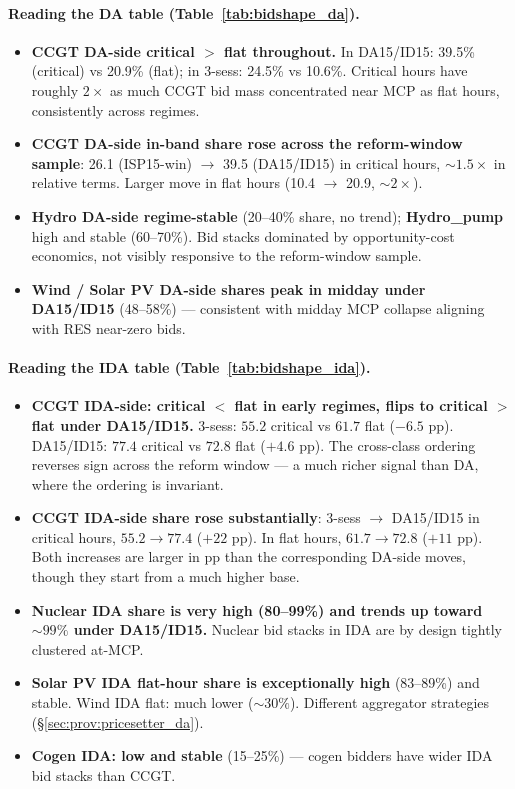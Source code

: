 \documentclass[11pt,a4paper]{article}
\begin{document}
\paragraph{Reading the DA table (Table~\ref{tab:bidshape_da}).}
\begin{itemize}
\item \textbf{CCGT DA-side critical $>$ flat throughout.} In DA15/ID15: 39.5\% (critical) vs 20.9\% (flat); in 3-sess: 24.5\% vs 10.6\%. Critical hours have roughly $2\times$ as much CCGT bid mass concentrated near MCP as flat hours, consistently across regimes.
\item \textbf{CCGT DA-side in-band share rose across the reform-window sample}: 26.1 (ISP15-win) $\to$ 39.5 (DA15/ID15) in critical hours, $\sim 1.5\times$ in relative terms. Larger move in flat hours (10.4 $\to$ 20.9, $\sim 2\times$).
\item \textbf{Hydro DA-side regime-stable} (20--40\% share, no trend); \textbf{Hydro\_pump} high and stable (60--70\%). Bid stacks dominated by opportunity-cost economics, not visibly responsive to the reform-window sample.
\item \textbf{Wind / Solar PV DA-side shares peak in midday under DA15/ID15} (48--58\%) --- consistent with midday MCP collapse aligning with RES near-zero bids.
\end{itemize}

\paragraph{Reading the IDA table (Table~\ref{tab:bidshape_ida}).}
\begin{itemize}
\item \textbf{CCGT IDA-side: critical $<$ flat in early regimes, flips to critical $>$ flat under DA15/ID15.} 3-sess: $55.2$ critical vs $61.7$ flat ($-6.5$ pp). DA15/ID15: $77.4$ critical vs $72.8$ flat ($+4.6$ pp). The cross-class ordering reverses sign across the reform window --- a much richer signal than DA, where the ordering is invariant.
\item \textbf{CCGT IDA-side share rose substantially}: 3-sess $\to$ DA15/ID15 in critical hours, $55.2 \to 77.4$ ($+22$ pp). In flat hours, $61.7 \to 72.8$ ($+11$ pp). Both increases are larger in pp than the corresponding DA-side moves, though they start from a much higher base.
\item \textbf{Nuclear IDA share is very high (80--99\%) and trends up toward $\sim 99\%$ under DA15/ID15.} Nuclear bid stacks in IDA are by design tightly clustered at-MCP.
\item \textbf{Solar PV IDA flat-hour share is exceptionally high} (83--89\%) and stable. Wind IDA flat: much lower ($\sim 30\%$). Different aggregator strategies (\S\ref{sec:prov:pricesetter_da}).
\item \textbf{Cogen IDA: low and stable} (15--25\%) — cogen bidders have wider IDA bid stacks than CCGT.
\end{itemize}
\end{document}
